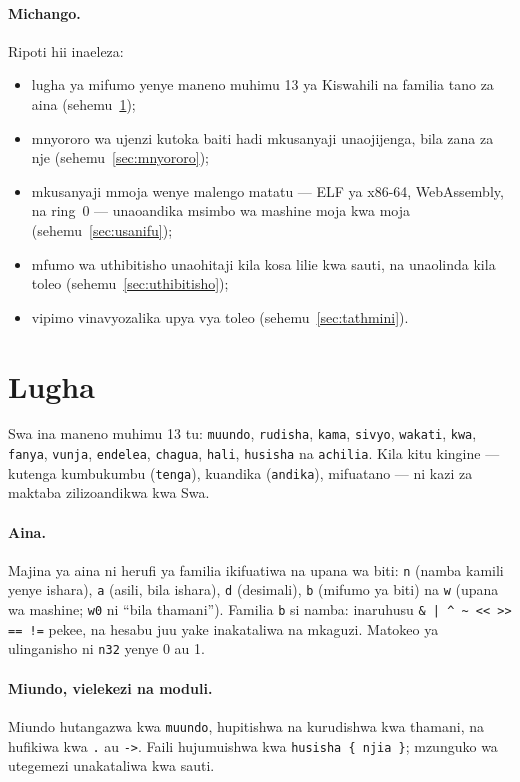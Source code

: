 \documentclass[11pt,a4paper]{article}
\begin{document}
\paragraph{Michango.} Ripoti hii inaeleza:
\begin{itemize}
  \item lugha ya mifumo yenye maneno muhimu 13 ya Kiswahili na familia tano za aina (sehemu~\ref{sec:lugha});
  \item mnyororo wa ujenzi kutoka baiti \KwanzaBaiti{} hadi mkusanyaji unaojijenga, bila zana za nje (sehemu~\ref{sec:mnyororo});
  \item mkusanyaji mmoja wenye malengo matatu --- ELF ya x86-64, WebAssembly, na ring~0 --- unaoandika msimbo wa mashine moja kwa moja (sehemu~\ref{sec:usanifu});
  \item mfumo wa uthibitisho unaohitaji kila kosa lilie kwa sauti, na unaolinda kila toleo (sehemu~\ref{sec:uthibitisho});
  \item vipimo vinavyozalika upya vya toleo \Toleo{} (sehemu~\ref{sec:tathmini}).
\end{itemize}

\section{Lugha}\label{sec:lugha}

Swa ina maneno muhimu 13 tu: \texttt{muundo}, \texttt{rudisha}, \texttt{kama}, \texttt{sivyo}, \texttt{wakati}, \texttt{kwa}, \texttt{fanya}, \texttt{vunja}, \texttt{endelea}, \texttt{chagua}, \texttt{hali}, \texttt{husisha} na \texttt{achilia}. Kila kitu kingine --- kutenga kumbukumbu (\texttt{tenga}), kuandika (\texttt{andika}), mifuatano --- ni kazi za maktaba zilizoandikwa kwa Swa.

\paragraph{Aina.} Majina ya aina ni herufi ya familia ikifuatiwa na upana wa biti: \texttt{n} (namba kamili yenye ishara), \texttt{a} (asili, bila ishara), \texttt{d} (desimali), \texttt{b} (mifumo ya biti) na \texttt{w} (upana wa mashine; \texttt{w0} ni ``bila thamani''). Familia \texttt{b} si namba: inaruhusu \texttt{\& | \^{} \textasciitilde{} << >> == !=} pekee, na hesabu juu yake inakataliwa na mkaguzi. Matokeo ya ulinganisho ni \texttt{n32} yenye 0 au 1.

\paragraph{Miundo, vielekezi na moduli.} Miundo hutangazwa kwa \texttt{muundo}, hupitishwa na kurudishwa kwa thamani, na hufikiwa kwa \texttt{.} au \texttt{->}. Faili hujumuishwa kwa \texttt{husisha \{ njia \}}; mzunguko wa utegemezi unakataliwa kwa sauti.
\end{document}
